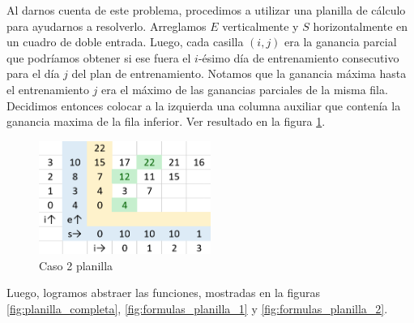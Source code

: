 Al darnos cuenta de este problema, procedimos a utilizar una planilla de cálculo para ayudarnos a resolverlo.
Arreglamos $E$ verticalmente y $S$ horizontalmente en un cuadro de doble entrada. Luego, cada
casilla $(i, j)$ era la ganancia parcial que podríamos obtener si ese fuera el $i$-ésimo día
de entrenamiento consecutivo para el día $j$ del plan de entrenamiento. Notamos que la ganancia
máxima hasta el entrenamiento $j$ era el máximo de las ganancias parciales de la misma fila.
Decidimos entonces colocar a la izquierda una columna auxiliar que contenía la ganancia maxima
de la fila inferior. Ver resultado en la figura \ref{fig:planilla_caso_2}.

\begin{figure}[H]
    \centering
    \includegraphics[width=0.5\textwidth]{img/planilla_caso_2.png}
    \caption{Caso 2 planilla}
    \label{fig:planilla_caso_2}
\end{figure}

Luego, logramos abstraer las funciones, mostradas en la figuras \ref{fig:planilla_completa},
\ref{fig:formulas_planilla_1} y  \ref{fig:formulas_planilla_2}.

